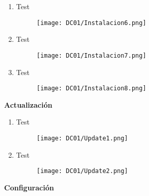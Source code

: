 \begin{enumerate}
\item Test

\begin{figure}[H] %
\begin{center}
\texttt{[image: DC01/Instalacion6.png]}
\end{center}
\end{figure}

\item Test

\begin{figure}[H] %
\begin{center}
\texttt{[image: DC01/Instalacion7.png]}
\end{center}
\end{figure}

\item Test

\begin{figure}[H] %
\begin{center}
\texttt{[image: DC01/Instalacion8.png]}
\end{center}
\end{figure}

\end{enumerate}


\textbf{Actualización}

\begin{enumerate}
\item Test

\begin{figure}[H] %
\begin{center}
\texttt{[image: DC01/Update1.png]}
\end{center}
\end{figure}

\item Test

\begin{figure}[H] %
\begin{center}
\texttt{[image: DC01/Update2.png]}
\end{center}
\end{figure}

\end{enumerate}

\textbf{Configuración}


